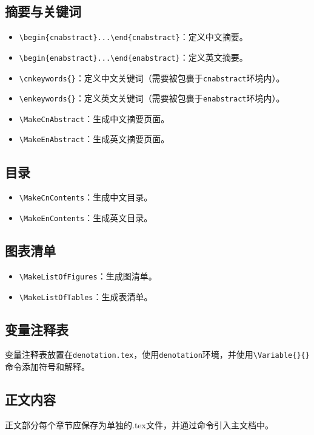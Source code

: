 \subsection{摘要与关键词}
\begin{itemize}[itemsep=2pt,topsep=5pt]
    \item \verb|\begin{cnabstract}...\end{cnabstract}|：定义中文摘要。
    \item \verb|\begin{enabstract}...\end{enabstract}|：定义英文摘要。
    \item \verb|\cnkeywords{}|：定义中文关键词（需要被包裹于\texttt{cnabstract}环境内）。
    \item \verb|\enkeywords{}|：定义英文关键词（需要被包裹于\texttt{enabstract}环境内）。
    \item \verb|\MakeCnAbstract|：生成中文摘要页面。
    \item \verb|\MakeEnAbstract|：生成英文摘要页面。
\end{itemize}

\subsection{目录}
\begin{itemize}[itemsep=2pt,topsep=5pt]
    \item \verb|\MakeCnContents|：生成中文目录。
    \item \verb|\MakeEnContents|：生成英文目录。
\end{itemize}

\subsection{图表清单}
\begin{itemize}[itemsep=2pt,topsep=5pt]
    \item \verb|\MakeListOfFigures|：生成图清单。
    \item \verb|\MakeListOfTables|：生成表清单。
\end{itemize}

\subsection{变量注释表}
变量注释表放置在\texttt{denotation.tex}，使用\texttt{denotation}环境，并使用\verb|\Variable{}{}|命令添加符号和解释。

\subsection{正文内容}
正文部分每个章节应保存为单独的.tex文件，并通过\verb||命令引入主文档中。

